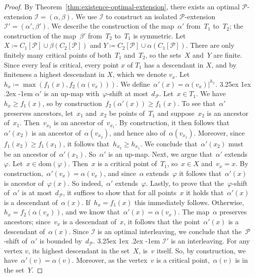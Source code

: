 \documentclass[11pt]{article}
\makeatletter
\newcommand{\dom}{\mathrm{dom}}
\newcommand{\an}[2]{#1|^{#2}}
\newcommand{\resdist}[1]{d_{#1}}
\renewcommand{\phi}{\varphi}
\newcommand{\I}{\mathcal{I}}
\renewcommand{\P}{\mathcal{P}}
\newcommand{\proofsubparagraph}{\@startsection{subparagraph}{5}{\z@}%
                                       {3.25ex \@plus1ex \@minus .2ex}%
                                       {-1em}%
                                      {\color{lipicsGray}\sffamily\normalsize\bfseries}}
\makeatother
\begin{document}
\begin{proof}
By Theorem~\ref{thm:existence-optimal-extension}, there exists an optimal $\P$-extension $\I=(\alpha,\beta)$.
We use $\I$ to construct an isolated $\P$-extension $\I'=(\alpha',\beta')$.
We describe the construction of the map~$\alpha'$ from~$T_1$ to~$T_2$; the construction of the map~$\beta'$ from~$T_2$ to~$T_1$ is symmetric.
%
Let $X \coloneqq C_1[\P]\cup\beta(C_2[\P])$ and $Y \coloneqq C_2[\P] \cup \alpha(C_1[\P])$.
There are only finitely many critical points of both~$T_1$ and~$T_2$, so the sets~$X$ and~$Y$ are finite.
Since every leaf is critical, every point $x$ of $T_1$ has a descendant in $X$, and by finiteness a highest descendant in $X$, which we denote $v_x$.
Let~$h_x \coloneqq \max(f_1(x), f_2(\alpha(v_x)))$.
We define~$\alpha'(x) = \an{\alpha(v_x)}{h_x}$.
%
\proofsubparagraph{$\alpha'$ is an up-map with~$\phi$-shift at most~$\resdist{\P}$.}
Let~$x \in T_1$.
We have~$h_x \ge f_1(x)$, so by construction~$f_2(\alpha'(x)) \ge f_1(x)$.
To see that~$\alpha'$ preserves ancestors, let~$x_1$ and~$x_2$ be points of~$T_1$ and suppose~$x_2$ is an ancestor of~$x_1$.
Then~$v_{x_2}$ is an ancestor of~$v_{x_1}$.
By construction, it then follows that~$\alpha'(x_2)$ is an ancestor of~$\alpha(v_{x_2})$, and hence also of~$\alpha(v_{x_1})$.
Moreover, since~$f_1(x_2) \ge f_1(x_1)$, it follows that~$h_{x_2} \ge h_{x_1}$.
We conclude that~$\alpha'(x_2)$ must be an ancestor of~$\alpha'(x_1)$.
So~$\alpha'$ is an up-map.
%
Next, we argue that~$\alpha'$ extends~$\phi$.
Let~$x \in \dom(\phi)$.
Then~$x$ is a critical point of~$T_1$, so~$x \in X$ and~$v_x = x$.
By construction,~$\alpha'(v_x) = \alpha(v_x)$, and since~$\alpha$ extends~$\phi$ it follows that~$\alpha'(x)$ is ancestor of~$\phi(x)$.
So indeed,~$\alpha'$ extends~$\phi$.
Lastly, to prove that the~$\phi$-shift of~$\alpha'$ is at most~$\resdist{\P}$, it suffices to show that for all points~$x$ it holds that~$\alpha'(x)$ is a descendant of~$\alpha(x)$.
If~$h_x = f_1(x)$ this immediately follows.
Otherwise,~$h_x = f_2(\alpha(v_x))$, and we know that~$\alpha'(x) = \alpha(v_x)$.
The map~$\alpha$ preserves ancestors; since~$v_x$ is a descendant of~$x$, it follows that the point~$\alpha'(x)$ is a descendant of~$\alpha(x)$.
Since $\I$ is an optimal interleaving, we conclude that the~$\P$-shift of~$\alpha'$ is bounded by~$\resdist{\P}$. 
%
\proofsubparagraph{$\I'$ is an interleaving.}
For any vertex $v$, its highest descendant in the set~$X$, is~$v$ itself.
So, by construction, we have~$\alpha'(v) = \alpha(v)$.
Moreover, as the vertex~$v$ is a critical point,~$\alpha(v)$ is in the set~$Y$.

\end{proof}
\end{document}
